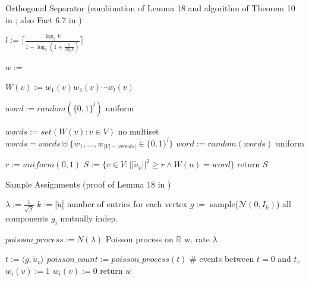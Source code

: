 \documentclass{beamer}
\begin{document}
\begin{frame}
\begin{algorithm}[H]
\caption{Orthogonal Separator (combination of Lemma 18 and algorithm of Theorem 10 in \cite{LouisM14}; also Fact 6.7 in \cite{ChanLTZ16}) \label{alg:orthogonal_separator}} 

\begin{algorithmic}
\State $l := \lceil \frac{\log_2 k}{1-\log_2 (1+\frac{2}{log_2 k})}\rceil$



\State $w := $

\State $W(v) := w_1(v)w_2(v)\cdots w_l(v)$
\EndFor

\State $word := random( \{0,1\}^l)$ \Comment uniform

\Else

\State $words := set({W(v): v\in V})$ \Comment no multiset
\State $words = words \uplus \{w_1, \ldots , w_{|V|-|words|} \in \{0,1\}^l\} $ 
\State $word := random(words)$ \Comment uniform

\EndIf

\State $r := uniform(0,1)$
\State $S := \{v \in V: ||\tilde{u}_v||^2 \ge r \land W(u) = word \}$
\State return $S$

\EndFunction %
\end{algorithmic}
\end{algorithm}	
\end{frame}
\begin{frame}
\begin{algorithm}[H]
\caption{Sample Assignments (proof of Lemma 18 in \cite{LouisM14}) \label{alg:sample_assignments}} 
\begin{algorithmic}
\State $\lambda := \frac{1}{\sqrt{\beta}}$
\State $k:= |\tilde{u}|$ \Comment number of entries for each vertex
\State $g:=$ sample($\mathcal{N}(0,I_k)$) \Comment all components $g_i$ mutually indep.

\State $poisson\_process := N(\lambda)$ \Comment Poisson process on $\mathbb{R}$ w. rate $\lambda$



\State $t := \langle g, \tilde{u}_v \rangle $
\State $poisson\_count := poisson\_process(t)$ 
\State\Comment \# events between $t=0$ and $t_v$
\State $w_i(v) := 1$
\Else
\State  $w_i(v) := 0$
\EndIf
\EndFor
\EndFor
\State return $w$
\EndFunction %
\end{algorithmic}
\end{algorithm}	


\end{frame}
	
\end{document}

